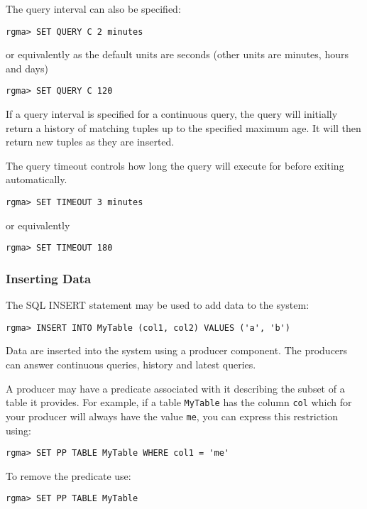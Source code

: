 The query interval can also be specified:

\begin{verbatim}
rgma> SET QUERY C 2 minutes
\end{verbatim}
or equivalently as the default units are seconds (other units are minutes,
hours and days)
\begin{verbatim}
rgma> SET QUERY C 120
\end{verbatim}

If a query interval is specified for a continuous query, the query will
initially return a history of matching tuples up to the specified
maximum age. It will then return new tuples as they are
inserted.

The query timeout controls how long the query
will execute for before exiting automatically.

\begin{verbatim}
rgma> SET TIMEOUT 3 minutes
\end{verbatim}
or equivalently
\begin{verbatim}
rgma> SET TIMEOUT 180
\end{verbatim}

\subsubsection{Inserting Data}

The SQL INSERT statement may be used to add data to the system:

\begin{verbatim}
rgma> INSERT INTO MyTable (col1, col2) VALUES ('a', 'b')
\end{verbatim}

Data are inserted into the system using a producer component. The
producers can answer continuous queries, history and latest queries.

A producer may have a predicate associated with it describing the
subset of a table it provides. For example, if a table
\texttt{MyTable} has the column \texttt{col} which for your producer
will always have the value \texttt{me}, you can express this
restriction using:

\begin{verbatim}
rgma> SET PP TABLE MyTable WHERE col1 = 'me'
\end{verbatim}

To remove the predicate use:

\begin{verbatim}
rgma> SET PP TABLE MyTable
\end{verbatim}

